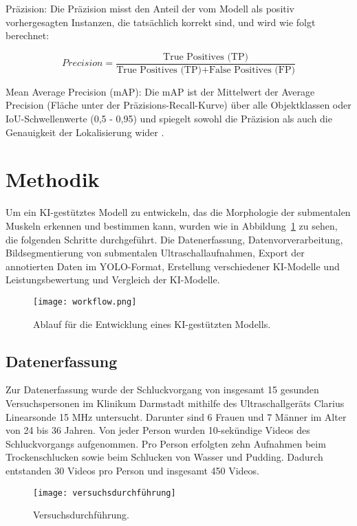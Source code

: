 \documentclass[
	german,
	accentcolor=10c,%
	type=intern,
	marginpar=false
	]{tudapub}
\begin{document}
Präzision: Die Präzision misst den Anteil der vom Modell als positiv vorhergesagten Instanzen, die tatsächlich korrekt sind, und wird wie folgt berechnet:

\[
Precision = \frac{\text{True Positives (TP)}}{\text{True Positives (TP)} + \text{False Positives (FP)}}
\]

Mean Average Precision (mAP): Die mAP ist der Mittelwert der Average Precision (Fläche unter der Präzisions-Recall-Kurve) über alle Objektklassen oder IoU-Schwellenwerte (0,5 - 0,95) und spiegelt sowohl die Präzision als auch die Genauigkeit der Lokalisierung wider \cite{ref7}.

\section{Methodik}
Um ein KI-gestütztes Modell zu entwickeln, das die Morphologie der submentalen Muskeln erkennen und bestimmen kann, wurden wie in Abbildung~\ref{fig:workflow} zu sehen, die folgenden Schritte durchgeführt. Die Datenerfassung, Datenvorverarbeitung, Bildsegmentierung von submentalen Ultraschallaufnahmen, Export der annotierten Daten im YOLO-Format, Erstellung verschiedener KI-Modelle und Leistungsbewertung und Vergleich der KI-Modelle.

\begin{figure}[H]
    \centering
    \texttt{[image: workflow.png]}
    \caption{Ablauf für die Entwicklung eines KI-gestützten Modells.}
    \label{fig:workflow}
\end{figure}

\subsection{Datenerfassung}
Zur Datenerfassung wurde der Schluckvorgang von insgesamt 15 gesunden Versuchspersonen im Klinikum Darmstadt mithilfe des Ultraschallgeräts Clarius Linearsonde 15 MHz untersucht. Darunter sind 6 Frauen und 7 Männer im Alter von 24 bis 36 Jahren. Von jeder Person wurden 10-sekündige Videos des Schluckvorgangs aufgenommen. Pro Person erfolgten zehn Aufnahmen beim Trockenschlucken sowie beim Schlucken von Wasser und Pudding. Dadurch entstanden 30 Videos pro Person und insgesamt 450 Videos.

\begin{figure}[H]
    \centering
    \texttt{[image: versuchsdurchführung]}
    \caption{Versuchsdurchführung.}
    \label{fig:versuchsdurchführung}
\end{figure}
\end{document}
